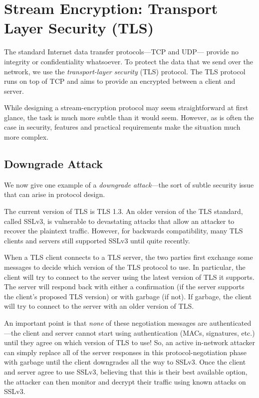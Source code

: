 \section{Stream Encryption: Transport Layer Security (TLS)}
The standard Internet data transfer protocols---TCP and UDP---%
provide no integrity or confidentiality whatsoever.
To protect the data that we send over the network, 
we use the \emph{transport-layer security} (TLS) protocol.
The TLS protocol runs on top of TCP and aims to 
provide an encrypted  between a
client and server.

While designing a stream-encryption protocol may seem straightforward
at first glance, the task is much more subtle than it would seem.
However, as is often the case in security, 
features and practical requirements make the situation much more complex.

\subsection{Downgrade Attack}
We now give one example of a \emph{downgrade attack}---the
sort of subtle security issue that can arise in protocol design.

The current version of TLS is TLS 1.3. An older
version of the TLS standard, called SSLv3,
is vulnerable to devastating
attacks that allow an attacker to recover the plaintext traffic.
However, for backwards compatibility, many TLS clients
and servers still supported SSLv3 until quite recently.

When a TLS client connects to a TLS server, the two parties
first exchange some messages to decide which version of the TLS
protocol to use.
In particular, the client will try to connect to the server using
the latest version of TLS it supports.
The server will respond back with either a confirmation 
(if the server supports the client's proposed TLS version) or with garbage
(if not).
If garbage, the client will try to connect to the server
with an older version of TLS.

An important point is that \emph{none} of these negotiation messages
are authenticated---the client and server cannot start
using authentication (MACs, signatures, etc.) until they agree on 
which version of TLS to use!
So, an active in-network attacker
can simply replace all of the server responses in
this protocol-negotiation phase
with garbage until the client downgrades all the way to SSLv3.
Once the client and server agree to use SSLv3,
believing that this is their best available option,
the attacker can then monitor and decrypt their
traffic using known attacks on SSLv3.

